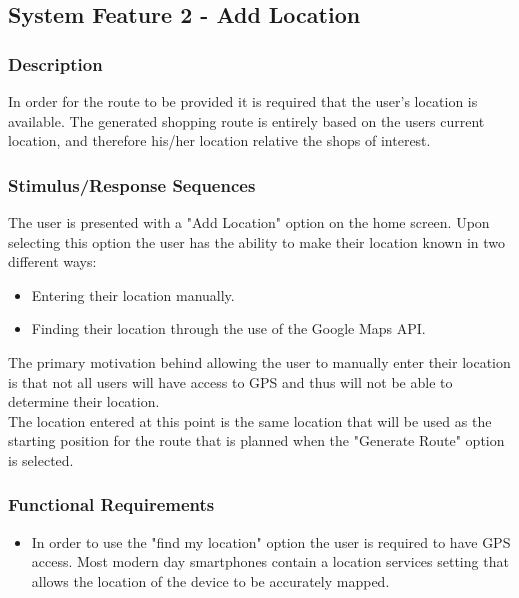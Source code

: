 \documentclass[10pt, a4paper, onecolumn]{scrartcl}
\begin{document}
		\subsection{System Feature 2 - Add Location}
				
			\subsubsection{Description}
			
				In order for the route to be provided it is required that the user's location is available. The generated shopping route is entirely based on the users current location, and therefore his/her location relative the shops of interest. 
				
			\subsubsection{Stimulus/Response Sequences}
			
				The user is presented with a "Add Location" option on the home screen. Upon selecting this option the user has the ability to make their location known in two different ways:
				
				\begin{itemize}
					\item Entering their location manually.
					\item Finding their location through the use of the Google Maps API.
				\end{itemize}
				
				The primary motivation behind allowing the user to manually enter their location is that not all users will have access to GPS and thus will not be able to determine their location. \\
				
				The location entered at this point is the same location that will be used as the starting position for the route that is planned when the "Generate Route" option is selected.
				
			\subsubsection{Functional Requirements}
			
				\begin{itemize}
					\item In order to use the "find my location" option the user is required to have GPS access. Most modern day smartphones contain a location services setting that allows the location of the device to be accurately mapped. 
				\end{itemize}
				
\end{document}
